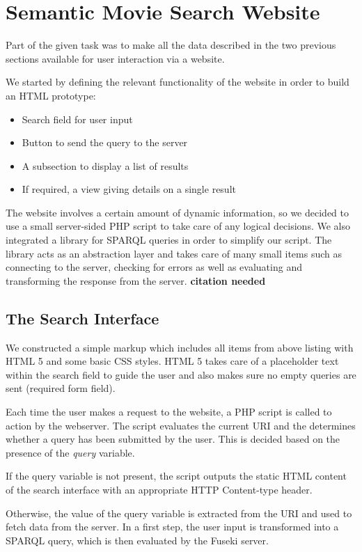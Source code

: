 \section{Semantic Movie Search Website}
Part of the given task was to make all the data described in the two previous sections available for user interaction via a website.

We started by defining the relevant functionality of the website in order to build an HTML prototype:

\begin{itemize}
\item Search field for user input
\item Button to send the query to the server
\item A subsection to display a list of results
\item If required, a view giving details on a single result
\end{itemize}

The website involves a certain amount of dynamic information, so we decided to use a small server-sided PHP script to take care of any logical decisions. We also integrated a library for SPARQL queries in order to simplify our script. The library acts as an abstraction layer and takes care of many small items such as connecting to the server, checking for errors as well as evaluating and transforming the response from the server. \textbf{citation needed}

\subsection{The Search Interface}
We constructed a simple markup which includes all items from above listing with HTML 5 and some basic CSS styles. HTML 5 takes care of a placeholder text within the search field to guide the user and also makes sure no empty queries are sent (required form field).

Each time the user makes a request to the website, a PHP script is called to action by the webserver. The script evaluates the current URI and the determines whether a query has been submitted by the user. This is decided based on the presence of the \emph{query} variable.

If the query variable is not present, the script outputs the static HTML content of the search interface with an appropriate HTTP Content-type header.

Otherwise, the value of the query variable is extracted from the URI and used to fetch data from the server. In a first step, the user input is transformed into a SPARQL query, which is then evaluated by the Fuseki server.

